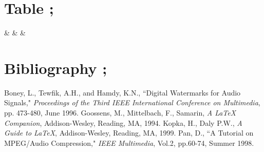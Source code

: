 \documentclass{article}
\author{Rohit Bhaurao Torkad}
\date{10-01-2023}
\begin{document}
\section{Table ;}
	{\thecsvrow & \Name & \Age & \Gender}%
	\newpage

\section{Bibliography ;}	
	\begin{thebibliography}{100} %
		 Boney, L., Tewfik, A.H., and Hamdy, K.N., ``Digital
		Watermarks for Audio Signals," \emph{Proceedings of the Third IEEE
			International Conference on Multimedia}, pp. 473-480, June 1996.
		 Goossens, M., Mittelbach, F., Samarin, \emph{A LaTeX
			Companion}, Addison-Wesley, Reading, MA, 1994.
		 Kopka, H., Daly P.W., \emph{A Guide to LaTeX},
		Addison-Wesley, Reading, MA, 1999.
		 Pan, D., ``A Tutorial on MPEG/Audio Compression," \emph{IEEE
			Multimedia}, Vol.2, pp.60-74, Summer 1998.
	\end{thebibliography}
\end{document}

